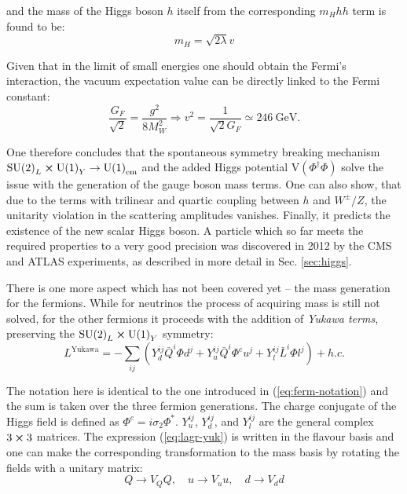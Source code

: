 and the mass of the Higgs boson $h$ itself from the corresponding $m_Hhh$ term is found to be:
\begin{equation}
    m_H = \sqrt{2\lambda}v
\end{equation}

Given that in the limit of small energies one should obtain the Fermi's interaction, the vacuum expectation value can be directly linked to the Fermi constant:
\begin{equation}
    \dfrac{G_F}{\sqrt{2}} = \dfrac{g^2}{8M_W^2} \Rightarrow v^2 = \dfrac{1}{\sqrt{2}G_F} \simeq 246 ~\text{GeV}.
\end{equation}

One therefore concludes that the spontaneous symmetry breaking mechanism $\text{SU(2)}_L \cross \text{U(1)}_Y \to \text{U(1)}_\text{em}$ and the added Higgs potential $\text{V}(\Phi^\dag\Phi)$ solve the issue with the generation of the gauge boson mass terms. One can also show, that due to the terms with trilinear and quartic coupling between $h$ and $W^\pm/Z$, the unitarity violation in the scattering amplitudes vanishes. Finally, it predicts the existence of the new scalar Higgs boson. A particle which so far meets the required properties to a very good precision was discovered in 2012 by the CMS and ATLAS experiments, as described in more detail in Sec. \ref{sec:higgs}.  

There is one more aspect which has not been covered yet -- the mass generation for the fermions. While for neutrinos the process of acquiring mass is still not solved, for the other fermions it proceeds with the addition of \textit{Yukawa terms}, preserving the $\text{SU(2)}_L \cross \text{U(1)}_Y$ symmetry:
\begin{equation}\label{eq:lagr-yuk}
    L^\text{Yukawa} = - \sum_{ij} \left(Y^{ij}_d \bar{Q}^i \Phi d^j + Y^{ij}_u \bar{Q}^i \Phi^c u^j + Y^{ij}_l \bar{L}^i \Phi l^j\right) + h.c.
\end{equation}

The notation here is identical to the one introduced in (\ref{eq:ferm-notation}) and the sum is taken over the three fermion generations. The charge conjugate of the Higgs field is defined as $\Phi^c = i\sigma_2\Phi^*$. $Y^{ij}_u$, $Y^{ij}_d$, and $Y^{ij}_l$ are the general complex $3\cross 3$ matrices. The expression (\ref{eq:lagr-yuk}) is written in the flavour basis and one can make the corresponding transformation to the mass basis by rotating the fields with a unitary matrix:
\begin{equation}
    Q \to V_Q Q, \quad u \to V_u u, \quad d \to V_d d
\end{equation}

